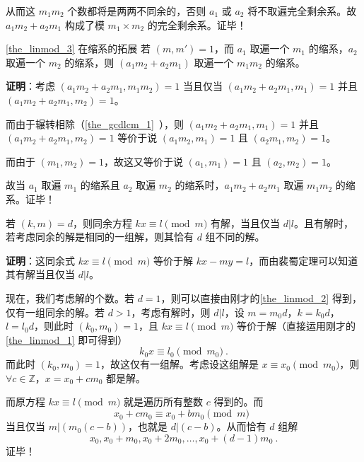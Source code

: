 从而这 $m_1m_2$ 个数都将是两两不同余的，否则 $a_1$ 或 $a_2$ 将不取遍完全剩余系。故 $a_1m_2+a_2m_1$ 构成了模 $m_1\times m_2$ 的完全剩余系。证毕！

\begin{theorem}{\autoref{the_linmod_3} 在缩系的拓展}
若 $(m, m') = 1$，而 $a_1$ 取遍一个 $m_1$ 的缩系，$a_2$ 取遍一个 $m_2$ 的缩系，则 $(a_1m_2 + a_2 m_1)$ 取遍一个 $m_1m_2$ 的缩系。
\end{theorem}
\textbf{证明}：考虑 $(a_1m_2 + a_2m_1, m_1m_2) = 1$ 当且仅当 $(a_1m_2 + a_2m_1, m_1) = 1$ 并且 $(a_1m_2 + a_2m_1, m_2) = 1$。

而由于辗转相除（\autoref{the_gcdlcm_1}~），则 $(a_1m_2 + a_2m_1, m_1) = 1$ 并且 $(a_1m_2 + a_2m_1, m_2) = 1$ 等价于说 $(a_1m_2, m_1) = 1$ 且 $(a_2m_1, m_2) = 1$。

而由于 $(m_1, m_2)=1$，故这又等价于说 $(a_1, m_1) = 1$ 且 $(a_2, m_2) = 1$。

故当 $a_1$ 取遍 $m_1$ 的缩系且 $a_2$ 取遍 $m_2$ 的缩系时，$a_1m_2+a_2m_1$ 取遍 $m_1m_2$ 的缩系。证毕！


\begin{theorem}{}\label{the_linmod_4}
若 $(k, m) = d$，则同余方程 $kx \equiv l \pmod m$ 有解，当且仅当 $d | l$。且有解时，若考虑同余的解是相同的一组解，则其恰有 $d$ 组不同的解。
\end{theorem}
\textbf{证明}：这同余式 $kx \equiv l \pmod m$ 等价于解 $kx - my = l$，而由裴蜀定理可以知道其有解当且仅当 $d | l$。

现在，我们考虑解的个数。若 $d=1$，则可以直接由刚才的\autoref{the_linmod_2} 得到，仅有一组同余的解。若 $d > 1$，考虑有解时，则 $d|l$，设 $m = m_0 d$，$k = k_0 d$，$l = l_0 d$，则此时 $(k_0, m_0) = 1$，且 $kx \equiv l \pmod m$ 等价于解（直接运用刚才的\autoref{the_linmod_1} 即可得到）
\begin{equation}
k_0 x \equiv l_0 \pmod {m_0} ~.
\end{equation}
而此时 $(k_0, m_0) = 1$，故这仅有一组解。考虑设这组解是 $x \equiv x_0 \pmod {m_0}$，则 $\forall c \in \mathbb Z$，$x = x_0 + c m_0$ 都是解。

而原方程 $kx \equiv l \pmod m$ 就是遍历所有整数 $c$ 得到的。而
\begin{equation}
x_0 + c m_0 \equiv x_0 + b m_0 \pmod m ~~
\end{equation}
当且仅当 $m | (m_0 (c - b))$，也就是 $d | (c - b)$。从而恰有 $d$ 组解
\begin{equation}
x_0, x_0 + m_0, x_0 + 2 m_0, \dots, x_0 + (d-1) m_0 ~.
\end{equation}
证毕！